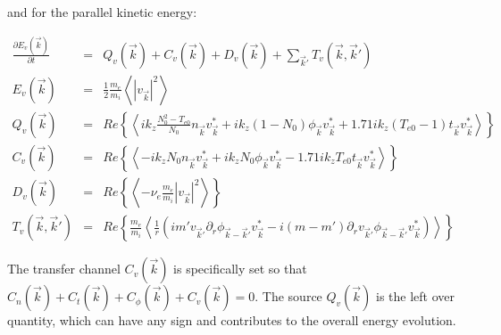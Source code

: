 \documentclass[showpacs,preprintnumbers,amsmath,amssymb,superscriptaddress,aip]{revtex4-1}
\def\beqar{\begin{eqnarray}}
\def\eeqar{\end{eqnarray}}
\newcommand{\pdiff}[2]{\frac{\partial#1}{\partial#2}}
\newcommand{\pdr}{\partial_r}
\newcommand{\nue}{\nu_{e}}
\newcommand{\fmei}{\frac{m_e}{m_i}}
\begin{document}
and for the parallel kinetic energy:

\beqar
\label{Fourier_vpar_evolution}
\pdiff{E_v(\vec{k})}{t} & = & Q_v(\vec{k}) + C_v(\vec{k}) + D_v(\vec{k}) + \sum_{\vec{k}'} T_v(\vec{k},\vec{k}') \\
E_v(\vec{k}) & = & \frac{1}{2} \fmei \left< |v_{\vec{k}}|^2 \right> \\
Q_v(\vec{k}) & = & Re \left\{ \left<  i k_z \frac{N_0^2 - T_{e0}}{N_0} n_{\vec{k}} v_{\vec{k}}^* + i k_z (1 - N_0) \phi_{\vec{k}} v_{\vec{k}}^* + 1.71 i k_z (T_{e0} -1) t_{\vec{k}} v_{\vec{k}}^*   \right> \right\} \\
C_v(\vec{k}) & = & Re \left\{ \left< - i k_z N_0 n_{\vec{k}} v_{\vec{k}}^* + i k_z N_0 \phi_{\vec{k}} v_{\vec{k}}^* - 1.71 i k_z T_{e0} t_{\vec{k}} v_{\vec{k}}^*  \right> \right\} \\
D_v(\vec{k}) & = & Re \left\{ \left< - \nue \fmei |v_{\vec{k}}|^2   \right> \right\} \\
T_v(\vec{k},\vec{k}') & = & Re \left\{ \fmei \left< \frac{1}{r} \left( i m' v_{\vec{k}'} \pdr \phi_{\vec{k}-\vec{k}'} v_{\vec{k}}^*  - i (m - m') \pdr v_{\vec{k}'} \phi_{\vec{k}-\vec{k}'} v_{\vec{k}}^*        \right) \right> \right\}
\eeqar

The transfer channel $C_v(\vec{k})$ is specifically set so that $C_n(\vec{k}) + C_t(\vec{k}) + C_\phi(\vec{k}) + C_v(\vec{k}) = 0$. 
The source $Q_v(\vec{k})$ is the left over quantity, which can have any sign and contributes to the overall energy evolution.





\end{document}
